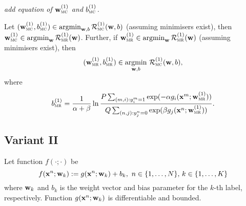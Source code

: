 \TODO
{\it add equation of $\mathbf{w}_\textsc{mc}^{({1})}$ and $b_\textsc{mc}^{({1})}$.}


\begin{theorem}
Let $(\mathbf{w}_\textsc{mc}^{({1})}, b_\textsc{mc}^{({1})}) \in \operatorname*{argmin}_{\mathbf{w}, b} \mathcal{R}_\textsc{mc}^{({1})}(\mathbf{w}, b)$ (assuming minimisers exist),
then $\mathbf{w}_\textsc{mc}^{({1})} \in \operatorname*{argmin}_{\mathbf{w}} \mathcal{R}_\textsc{mr}^{({1})}(\mathbf{w})$.
Further, if $\mathbf{w}_\textsc{mr}^{({1})} \in \operatorname*{argmin}_{\mathbf{w}} \mathcal{R}_\textsc{mr}^{({1})}(\mathbf{w})$ (assuming minimisers exist),
then 
$$
(\mathbf{w}_\textsc{mr}^{({1})}, b_\textsc{mr}^{({1})}) \in \operatorname*{argmin}_{\mathbf{w},b} \, \mathcal{R}_\textsc{mc}^{({1})}(\mathbf{w}, b),
$$ 
where
$$
b_\textsc{mr}^{({1})} = \frac{1}{\alpha + \beta} \ln 
      \frac{P \sum_{(m,i): y_i^m = 1} \exp(-\alpha g_i(\mathbf{x}^m; \mathbf{w}_\textsc{mr}^{({1})}))}
           {Q \sum_{(n,j): y_j^n = 0} \exp( \beta  g_j(\mathbf{x}^n; \mathbf{w}_\textsc{mr}^{({1})}))}.
$$
\end{theorem}



\subsection{Variant II}

Let function $f(\cdot; \cdot)$ be
\begin{equation*}
f(\mathbf{x}^n; \mathbf{w}_k) := g(\mathbf{x}^n; \mathbf{w}_k) + b_k, \ n \in \{1,\dots,N\}, \, k \in \{1,\dots,K\}
\end{equation*}
where $\mathbf{w}_k$ and $b_k$ is the weight vector and bias parameter for the $k$-th label, respectively.
Function $g(\mathbf{x}^n; \mathbf{w}_k)$ is differentiable and bounded.

